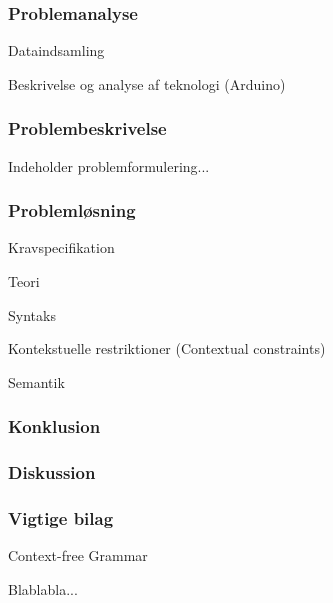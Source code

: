 \label{sec:rapportstruktur}


\subsubsection*{Problemanalyse}

\begin{itemize_small}
    \item Dataindsamling
    \item Beskrivelse og analyse af teknologi (Arduino)
\end{itemize_small}

\subsubsection*{Problembeskrivelse}
Indeholder problemformulering...

\subsubsection*{Problemløsning}

\begin{itemize_small}
    \item Kravspecifikation
    \item Teori
    \item Syntaks
    \item Kontekstuelle restriktioner (Contextual constraints)
    \item Semantik
\end{itemize_small}

\subsubsection*{Konklusion}

\subsubsection*{Diskussion}

\subsubsection*{Vigtige bilag}
\begin{itemize_small}
    \item Context-free Grammar
    \item Blablabla...
\end{itemize_small}